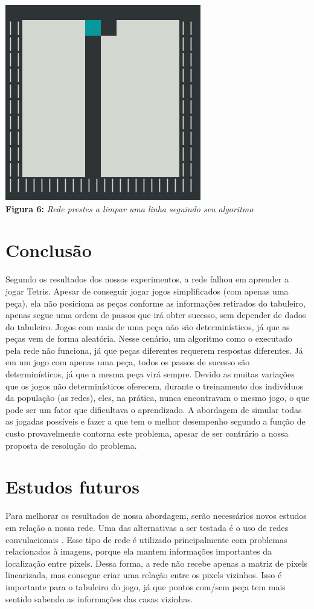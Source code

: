 \documentclass[conference]{IEEEtran}
\begin{document}
\begin{center}
\includegraphics[scale=0.3]{tetris_win.png}\\

\textbf{Figura 6:} \textit{Rede prestes a limpar uma linha seguindo seu algoritmo}
\end{center}


\section{Conclusão}
Segundo os resultados dos nossos experimentos, a rede falhou em aprender a jogar Tetris. Apesar de conseguir jogar jogos simplificados (com apenas uma peça), ela não posiciona as peças conforme as informações retirados do tabuleiro, apenas segue uma ordem de passos que irá obter sucesso, sem depender de dados do tabuleiro. Jogos com mais de uma peça não são determinísticos, já que as peças vem de forma aleatória. Nesse cenário, um algoritmo como o executado pela rede não funciona, já que peças diferentes requerem respostas diferentes. Já em um jogo com apenas uma peça, todos os passos de sucesso são determinísticos, já que a mesma peça virá sempre. Devido as muitas variações que os jogos não determinísticos oferecem, durante o treinamento dos indivíduos da população (as redes), eles, na prática, nunca encontravam o mesmo jogo, o que pode ser um fator que dificultava o aprendizado. A abordagem de simular todas as jogadas possíveis e fazer a que tem o melhor desempenho segundo a função de custo provavelmente contorna este problema, apesar de ser contrário a nossa proposta de resolução do problema. 


\section{Estudos futuros}
Para melhorar os resultados de nossa abordagem, serão necessários novos estudos em relação a nossa rede. Uma das alternativas a ser testada é o uso de redes convulacionais \cite{b15}. Esse tipo de rede é utilizado principalmente com problemas relacionados à imagens, porque ela mantem informações importantes da localização entre pixels. Dessa forma, a rede não recebe apenas a matriz de pixels linearizada, mas consegue criar uma relação entre os pixels vizinhos. Isso é importante para o tabuleiro do jogo, já que pontos com/sem peça tem mais sentido sabendo as informações das casas vizinhas.
\end{document}

